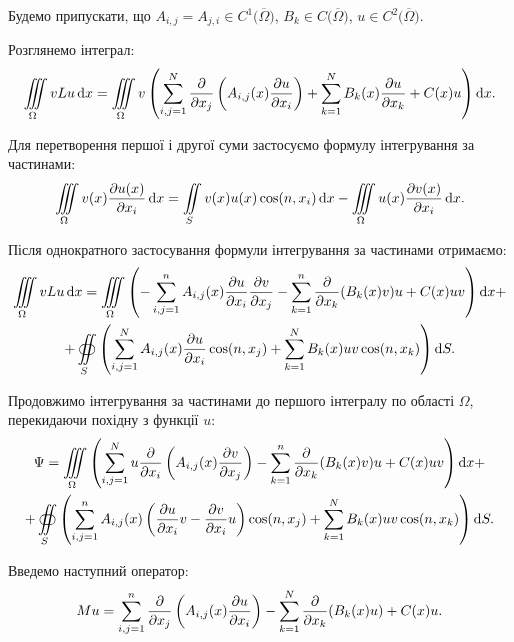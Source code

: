Будемо припускати, що $A_{i, j} = A_{j, i} \in C^1 \big( \overline \Omega \big)$, $B_k \in C \big( \overline \Omega \big)$, $u \in C^2 \big( \overline \Omega \big)$. \medskip

Розглянемо інтеграл:
\begin{equation}
    \displaystyle\iiint\limits_\Omega v L u \mathop{}\!\mathrm{d} x = \displaystyle\iiint\limits_\Omega v \left( \displaystyle\sum\limits_{i, j = 1}^N \frac{\partial}{\partial x_j} \left( A_{i,j}(x) \frac{\partial u}{\partial x_i} \right) + \displaystyle\sum\limits_{k = 1}^N B_k(x) \frac{\partial u}{\partial x_k} + C(x) u \right) \mathop{}\!\mathrm{d} x.
\end{equation}

Для перетворення першої і другої суми застосуємо формулу інтегрування за частинами:
\begin{equation}
    \displaystyle\iiint\limits_\Omega v(x) \frac{\partial u(x)}{\partial x_i} \mathop{}\!\mathrm{d} x = \displaystyle\iint\limits_S v(x) u(x) \cos(n, x_i) \mathop{}\!\mathrm{d} x - \displaystyle\iiint\limits_\Omega u(x) \frac{\partial v(x)}{\partial x_i} \mathop{}\!\mathrm{d} x.
\end{equation}

Після однократного застосування формули інтегрування за частинами отримаємо:
\begin{multline}
    \displaystyle\iiint\limits_\Omega v L u \mathop{}\!\mathrm{d} x = \displaystyle\iiint\limits_\Omega \left( - \displaystyle\sum\limits_{i, j = 1}^n A_{i, j}(x) \frac{\partial u}{\partial x_i} \frac{\partial v}{\partial x_j} - \displaystyle\sum\limits_{k = 1}^n \frac{\partial}{\partial x_k} (B_k(x) v) u + C(x) u v \right) \mathop{}\!\mathrm{d} x + \\
    + \displaystyle\oiint\limits_S \left( \displaystyle\sum\limits_{i, j = 1}^N A_{i, j}(x) \frac{\partial u}{\partial x_i} \cos(n, x_j) + \displaystyle\sum\limits_{k = 1}^N B_k(x) u v \cos(n, x_k) \right) \mathop{}\!\mathrm{d} S.
\end{multline}

Продовжимо інтегрування за частинами до першого інтегралу по області $\Omega$, перекидаючи похідну з функції $u$:
\begin{multline}
    \Psi = \displaystyle\iiint\limits_\Omega \left( \displaystyle\sum\limits_{i, j = 1}^N u \frac{\partial}{\partial x_i} \left( A_{i,j}(x) \frac{\partial v}{\partial x_j} \right) - \displaystyle\sum\limits_{k = 1}^n \frac{\partial}{\partial x_k} (B_k(x) v) u + C(x) u v \right) \mathop{}\!\mathrm{d} x + \\
    + \displaystyle\oiint\limits_S \left( \displaystyle\sum\limits_{i, j = 1}^n A_{i,j}(x) \left( \frac{\partial u}{\partial x_i} v - \frac{\partial v}{\partial x_i} u \right) \cos(n, x_j) + \displaystyle\sum\limits_{k = 1}^N B_k(x) u v \cos(n, x_k) \right) \mathop{}\!\mathrm{d} S.
\end{multline}

Введемо наступний оператор:
\begin{equation}
    M u = \displaystyle\sum\limits_{i, j = 1}^n \frac{\partial}{\partial x_j} \left( A_{i,j}(x) \frac{\partial u}{\partial x_i} \right) - \displaystyle\sum\limits_{k = 1}^N \frac{\partial}{\partial x_k} (B_k(x) u) + C(x) u.
\end{equation}

